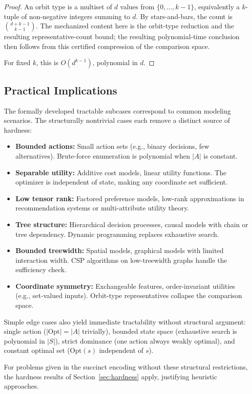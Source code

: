
\begin{proof}
An orbit type is a multiset of $d$ values from $\{0, \ldots, k-1\}$, equivalently a $k$-tuple of non-negative integers summing to $d$. By stars-and-bars, the count is $\binom{d + k - 1}{k - 1}$. The mechanized content here is the orbit-type reduction and the resulting representative-count bound; the resulting polynomial-time conclusion then follows from this certified compression of the comparison space.

For fixed $k$, this is $O(d^{k-1})$, polynomial in $d$.
\end{proof}

\subsection{Practical Implications}\label{sec:tract-practical}

The formally developed tractable subcases correspond to common modeling scenarios. The structurally nontrivial cases each remove a distinct source of hardness:

\begin{itemize}
\item \textbf{Bounded actions:} Small action sets (e.g., binary decisions, few alternatives). Brute-force enumeration is polynomial when $|A|$ is constant.
\item \textbf{Separable utility:} Additive cost models, linear utility functions. The optimizer is independent of state, making any coordinate set sufficient.
\item \textbf{Low tensor rank:} Factored preference models, low-rank approximations in recommendation systems or multi-attribute utility theory.
\item \textbf{Tree structure:} Hierarchical decision processes, causal models with chain or tree dependency. Dynamic programming replaces exhaustive search.
\item \textbf{Bounded treewidth:} Spatial models, graphical models with limited interaction width. CSP algorithms on low-treewidth graphs handle the sufficiency check.
\item \textbf{Coordinate symmetry:} Exchangeable features, order-invariant utilities (e.g., set-valued inputs). Orbit-type representatives collapse the comparison space.
\end{itemize}

Simple edge cases also yield immediate tractability without structural argument: single action ($|\mathrm{Opt}| = |A|$ trivially), bounded state space (exhaustive search is polynomial in $|S|$), strict dominance (one action always weakly optimal), and constant optimal set ($\mathrm{Opt}(s)$ independent of $s$).

For problems given in the succinct encoding without these structural restrictions, the hardness results of Section~\ref{sec:hardness} apply, justifying heuristic approaches.
